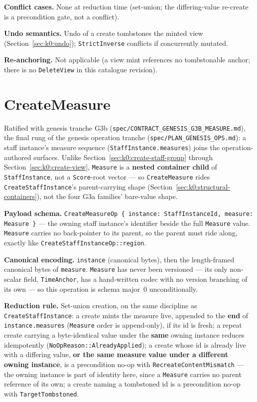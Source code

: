 \documentclass[11pt,letterpaper]{report}
\begin{document}
\textbf{Conflict cases.} None at reduction time (set-union; the differing-value
re-create is a precondition gate, not a conflict).

\textbf{Undo semantics.} Undo of a create tombstones the minted view
(Section~\ref{sec:k0:undo}); \texttt{StrictInverse} conflicts if concurrently
mutated.

\textbf{Re-anchoring.} Not applicable (a view mint references no tombstonable
anchor; there is no \texttt{DeleteView} in this catalogue revision).

\section{CreateMeasure}
\label{sec:k0:create-measure}

Ratified with genesis tranche G3b (\texttt{spec/CONTRACT\_GENESIS\_G3B\_MEASURE.md}),
the final rung of the genesis operation tranche
(\texttt{spec/PLAN\_GENESIS\_OPS.md}): a staff instance's measure sequence
(\texttt{StaffInstance.measures}) joins the operation-authored surfaces.
Unlike Section~\ref{sec:k0:create-staff-group} through
Section~\ref{sec:k0:create-view}, \texttt{Measure} is a \textbf{nested
container child} of \texttt{StaffInstance}, not a \texttt{Score}-root vector
--- so \texttt{CreateMeasure} rides \texttt{CreateStaffInstance}'s
parent-carrying shape (Section~\ref{sec:k0:structural-containers}), not the
four G3a families' bare-value shape.

\textbf{Payload schema.} \texttt{CreateMeasureOp \{ instance: StaffInstanceId,
measure: Measure \}} --- the owning staff instance's identifier beside the
full \texttt{Measure} value. \texttt{Measure} carries no back-pointer to its
parent, so the parent must ride along, exactly like
\texttt{CreateStaffInstanceOp::region}.

\textbf{Canonical encoding.} \texttt{instance} (canonical bytes), then the
length-framed canonical bytes of \texttt{measure}. \texttt{Measure} has never
been versioned --- its only non-scalar field, \texttt{TimeAnchor}, has a
hand-written codec with no version branching of its own --- so this operation
is schema major~0 unconditionally.

\textbf{Reduction rule.} Set-union creation, on the same discipline as
\texttt{CreateStaffInstance}: a create mints the measure live, appended to the
\textbf{end} of \texttt{instance.measures} (\texttt{Measure} order is
append-only), if its id is fresh; a repeat create carrying a byte-identical
value under the \textbf{same} owning instance reduces idempotently
(\texttt{NoOpReason::AlreadyApplied}); a create whose id is already live with a
differing value, \textbf{or the same measure value under a different owning
instance}, is a precondition no-op with \texttt{RecreateContentMismatch} ---
the owning instance is part of identity here, since a \texttt{Measure} carries
no parent reference of its own; a create naming a tombstoned id is a
precondition no-op with \texttt{TargetTombstoned}.
\end{document}
